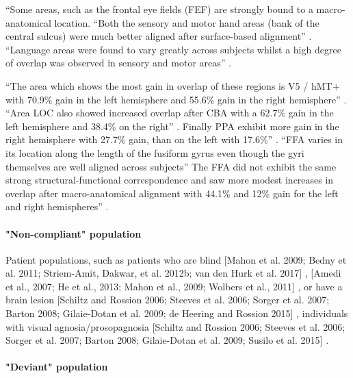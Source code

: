 %
``Some areas, such as the frontal eye fields (FEF) are strongly bound to a
macro-anatomical location.
%
``Both the sensory and motor hand areas (bank of the central sulcus) were much
better aligned after surface-based alignment'' \citep{frost2012measuring}.
%
``Language areas were found to vary greatly across subjects whilst a high degree
of overlap was observed in sensory and motor areas'' \citep{frost2012measuring}.

%
``The area which shows the most gain in overlap of these regions is V5 / hMT+
with 70.9\% gain in the left hemisphere and 55.6\% gain in the right
hemisphere'' \citep{frost2012measuring}.
%
``Area LOC also showed increased overlap after CBA with a 62.7\% gain in the
left hemisphere and 38.4\% on the right'' \citep{frost2012measuring}.
%
Finally PPA exhibit more gain in the right hemisphere with 27.7\% gain, than on
the left with 17.6\%'' \citep{frost2012measuring}.
%
``FFA varies in its location along the length of the fusiform gyrus even though
the gyri themselves are well aligned across subjects''
%
The FFA did not exhibit the same strong structural-functional correspondence and
saw more modest increases in overlap after macro-anatomical alignment with
44.1\% and 12\% gain for the left and right hemispheres''
\citep{frost2012measuring}.


\paragraph{"Non-compliant" population}


%
Patient populations, such as patients who
%
are blind
%
[Mahon et al. 2009; Bedny et al. 2011; Striem-Amit, Dakwar, et al.  2012b; van
den Hurk et al. 2017] \citep{rosenke2021probabilistic},
%
[Amedi et al., 2007; He et al., 2013; Mahon et al., 2009; Wolbers et al., 2011]
\citep{weiner2018defining}, or
%
have a brain lesion
%
[Schiltz and Rossion 2006; Steeves et al. 2006; Sorger et al. 2007; Barton 2008;
Gilaie-Dotan et al.  2009; de Heering and Rossion 2015]
\citep{rosenke2021probabilistic},
%
individuals with visual agnosia/prosopagnosia
%
[Schiltz and Rossion 2006; Steeves et al. 2006; Sorger et al. 2007; Barton 2008;
Gilaie-Dotan et al. 2009; Susilo et al. 2015] \citep{rosenke2021probabilistic}.


\paragraph{"Deviant" population}

